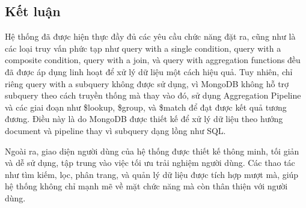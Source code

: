 \subsection{Kết luận}
Hệ thống đã được hiện thực đầy đủ các yêu cầu chức năng đặt ra, cũng như là các loại truy vấn phức tạp như query with a single condition, query with a composite condition, query with a join, và query with aggregation functions đều đã được áp dụng linh hoạt để xử lý dữ liệu một cách hiệu quả. Tuy nhiên, chỉ riêng query with a subquery không được sử dụng, vì MongoDB không hỗ trợ subquery theo cách truyền thống mà thay vào đó, sử dụng Aggregation Pipeline và các giai đoạn như \$lookup, \$group, và \$match để đạt được kết quả tương đương. Điều này là do MongoDB được thiết kế để xử lý dữ liệu theo hướng document và pipeline thay vì subquery dạng lồng như SQL.

Ngoài ra, giao diện người dùng của hệ thống được thiết kế thông minh, tối giản và dễ sử dụng, tập trung vào việc tối ưu trải nghiệm người dùng. Các thao tác như tìm kiếm, lọc, phân trang, và quản lý dữ liệu được tích hợp mượt mà, giúp hệ thống không chỉ mạnh mẽ về mặt chức năng mà còn thân thiện với người dùng.